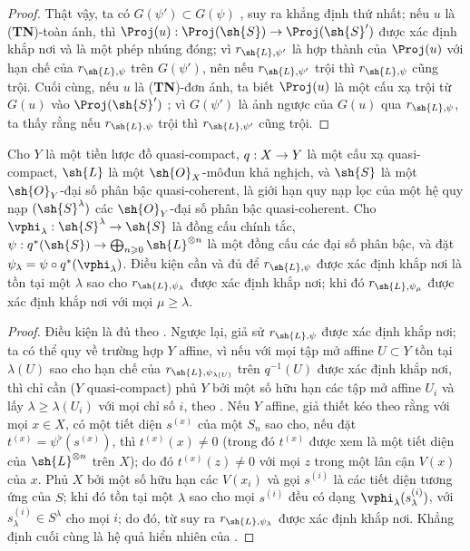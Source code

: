 \documentclass[oneside,10pt]{amsart}
\makeatletter
\renewcommand{\geq}{\geqslant}
\newcommand{\ega@arrow}[2]{\mathchoice{#1}{#2}{#2}{#2}}
\renewcommand{\to}{\ega@arrow{\longrightarrow}{\rightarrow}}
\let\EGAOriginalLabel\label
\renewcommand{\label}[1]{\phantomsection\EGAOriginalLabel{#1}}
\makeatother
\begin{document}
\begin{proof}
Thật vậy, ta có $G(\psi')\subset G(\psi)$ , suy ra khẳng định thứ nhất;
nếu $u$ là (\textbf{TN})-toàn ánh, thì $\Proj(u):\Proj(\sh{S})\to\Proj(\sh{S}')$ được xác định khắp nơi và là một phép nhúng đóng;
vì $r_{\sh{L},\psi'}$ là hợp thành của $\Proj(u)$ với hạn chế của $r_{\sh{L},\psi}$ trên $G(\psi')$, nên nếu $r_{\sh{L},\psi'}$ trội thì $r_{\sh{L},\psi}$ cũng trội.
Cuối cùng, nếu $u$ là (\textbf{TN})-đơn ánh, ta biết $\Proj(u)$ là một cấu xạ trội từ $G(u)$ vào $\Proj(\sh{S}')$ ;
vì $G(\psi')$ là ảnh ngược của $G(u)$ qua $r_{\sh{L},\psi}$, ta thấy rằng nếu $r_{\sh{L},\psi}$ trội thì $r_{\sh{L},\psi'}$ cũng trội.
\end{proof}

\begin{proposition}[3.7.7]
\label{II.3.7.7}
Cho $Y$ là một tiền lược đồ quasi-compact, $q:X\to Y$ là một cấu xạ quasi-compact, $\sh{L}$ là một $\sh{O}_X$-môđun khả nghịch, và $\sh{S}$ là một $\sh{O}_Y$-đại số phân bậc quasi-coherent, là giới hạn quy nạp lọc của một hệ quy nạp $(\sh{S}^\lambda)$ các $\sh{O}_Y$-đại số phân bậc quasi-coherent.
Cho $\vphi_\lambda:\sh{S}^\lambda\to\sh{S}$ là đồng cấu chính tắc, $\psi:q^*(\sh{S})\to\bigoplus_{n\geq0}\sh{L}^{\otimes n}$ là một đồng cấu các đại số phân bậc, và đặt $\psi_\lambda=\psi\circ q^*(\vphi_\lambda)$.
Điều kiện cần và đủ để $r_{\sh{L},\psi}$ được xác định khắp nơi là tồn tại một $\lambda$ sao cho $r_{\sh{L},\psi_\lambda}$ được xác định khắp nơi;
khi đó $r_{\sh{L},\psi_\mu}$ được xác định khắp nơi với mọi $\mu\geq\lambda$.
\end{proposition}

\begin{proof}
Điều kiện là đủ theo .
Ngược lại, giả sử $r_{\sh{L},\psi}$ được xác định khắp nơi;
ta có thể quy về trường hợp $Y$ affine, vì nếu với mọi tập mở affine $U\subset Y$ tồn tại $\lambda(U)$ sao cho hạn chế của $r_{\sh{L},\psi_{\lambda(U)}}$ trên $q^{-1}(U)$ được xác định khắp nơi, thì chỉ cần ($Y$ quasi-compact) phủ $Y$ bởi một số hữu hạn các tập mở affine $U_i$ và lấy $\lambda\geq\lambda(U_i)$ với mọi chỉ số $i$, theo .
Nếu $Y$ affine, giả thiết kéo theo rằng với mọi $x\in X$, có một tiết diện $s^{(x)}$ của một $S_n$ sao cho, nếu đặt $t^{(x)}=\psi^\flat(s^{(x)})$, thì $t^{(x)}(x)\neq0$ (trong đó $t^{(x)}$ được xem là một tiết diện của $\sh{L}^{\otimes n}$ trên $X$); do đó $t^{(x)}(z)\neq0$ với mọi $z$ trong một lân cận $V(x)$ của $x$.
Phủ $X$ bởi một số hữu hạn các $V(x_i)$ và gọi $s^{(i)}$ là các tiết diện tương ứng của $S$;
khi đó tồn tại một $\lambda$ sao cho mọi $s^{(i)}$ đều có dạng $\vphi_\lambda(s_\lambda^{(i)})$, với $s_\lambda^{(i)}\in S^\lambda$ cho mọi $i$;
do đó, từ  suy ra $r_{\sh{L},\psi_\lambda}$ được xác định khắp nơi.
Khẳng định cuối cùng là hệ quả hiển nhiên của .
\end{proof}
\end{document}
